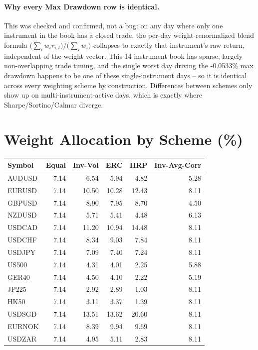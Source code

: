 \documentclass[11pt]{article}
\begin{document}
\paragraph{Why every Max Drawdown row is identical.} This was checked and confirmed, not a bug: on any day where only one instrument in the book has a closed trade, the per-day weight-renormalized blend formula $\big(\sum_i w_i r_{i,t}\big) / \big(\sum_i w_i\big)$ collapses to exactly that instrument's raw return, independent of the weight vector. This 14-instrument book has sparse, largely non-overlapping trade timing, and the single worst day driving the -0.0533\% max drawdown happens to be one of these single-instrument days -- so it is identical across every weighting scheme by construction. Differences between schemes only show up on multi-instrument-active days, which is exactly where Sharpe/Sortino/Calmar diverge.

\section*{Weight Allocation by Scheme (\%)}
\begin{table}[h]
\centering
\small
\begin{tabular}{lrrrrr}
\toprule
Symbol & Equal & Inv-Vol & ERC & HRP & Inv-Avg-Corr \\
\midrule
AUDUSD & 7.14 & 6.54 & 5.94 & 4.82 & 5.28 \\
EURUSD & 7.14 & 10.50 & 10.28 & 12.43 & 8.11 \\
GBPUSD & 7.14 & 8.90 & 7.95 & 8.70 & 4.50 \\
NZDUSD & 7.14 & 5.71 & 5.41 & 4.48 & 6.13 \\
USDCAD & 7.14 & 11.20 & 10.94 & 14.48 & 8.11 \\
USDCHF & 7.14 & 8.34 & 9.03 & 7.84 & 8.11 \\
USDJPY & 7.14 & 7.09 & 7.40 & 7.24 & 8.11 \\
US500 & 7.14 & 4.31 & 4.01 & 2.25 & 5.88 \\
GER40 & 7.14 & 4.50 & 4.10 & 2.22 & 5.19 \\
JP225 & 7.14 & 2.92 & 2.89 & 1.03 & 8.11 \\
HK50 & 7.14 & 3.11 & 3.37 & 1.39 & 8.11 \\
USDSGD & 7.14 & 13.51 & 13.62 & 20.60 & 8.11 \\
EURNOK & 7.14 & 8.39 & 9.94 & 9.69 & 8.11 \\
USDZAR & 7.14 & 4.95 & 5.11 & 2.83 & 8.11 \\
\bottomrule
\end{tabular}
\end{table}
\end{document}
